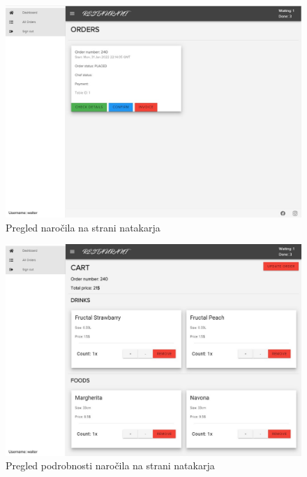 \documentclass[a4paper, 12pt]{book}
\begin{document}
\begin{figure}
\centering
\includegraphics[width=12cm]{order_4.jpg}
\caption{Pregled naročila na strani natakarja}
\label{Opis3}
\end{figure}
\begin{figure}
\centering
\includegraphics[width=12cm]{order_5.jpg}
\caption{Pregled podrobnosti naročila na strani natakarja}
\label{Opis33}
\end{figure}
\end{document}
